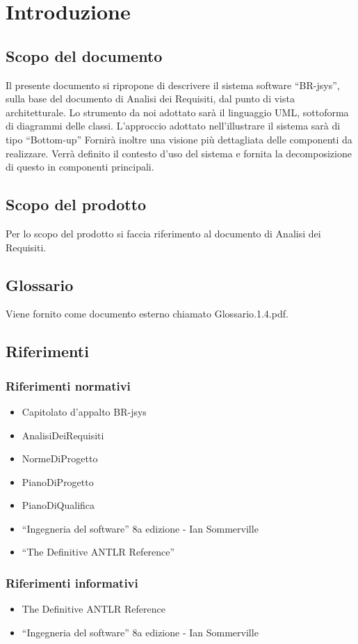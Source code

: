 \documentclass[11pt,titlepage,a4paper]{report}
\begin{document}
\chapter{Introduzione}
\section{Scopo del documento}
Il presente documento si ripropone di descrivere il sistema software ``BR-jsys'', sulla base del documento di Analisi dei Requisiti, dal punto di vista architetturale. Lo strumento da noi adottato sar\`a il linguaggio UML, sottoforma di diagrammi delle classi. L'approccio adottato nell'illustrare il sistema sar\`a di tipo ``Bottom-up'' Fornir\`a inoltre una visione pi\`u dettagliata delle componenti da realizzare.
Verr\`a definito il contesto d'uso del sistema e fornita la decomposizione di questo in componenti principali.
\section{Scopo del prodotto}
Per lo scopo del prodotto si faccia riferimento al documento di Analisi dei Requisiti.
\section{Glossario}
Viene fornito come documento esterno chiamato Glossario.1.4.pdf.
\section{Riferimenti}
\subsection{Riferimenti normativi}
\begin{itemize}
\item Capitolato d'appalto BR-jsys
\item AnalisiDeiRequisiti
\item NormeDiProgetto
\item PianoDiProgetto
\item PianoDiQualifica
\item ``Ingegneria del software'' 8a edizione - Ian Sommerville 
\item ``The Definitive ANTLR Reference''
\end{itemize}
\subsection{Riferimenti informativi}
\begin{itemize}
\item The Definitive ANTLR Reference
\item ``Ingegneria del software'' 8a edizione - Ian Sommerville
\end{itemize}
\end{document}
